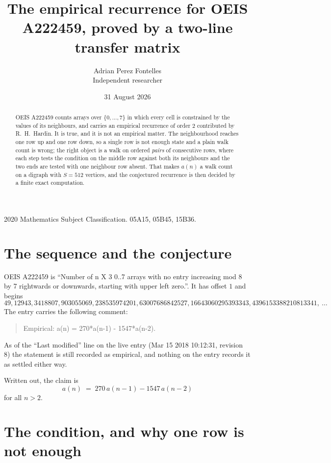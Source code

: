 \documentclass[11pt,a4paper]{article}
\title{The empirical recurrence for OEIS A222459, proved by a two-line transfer matrix}
\author{Adrian Perez Fontelles\\ \small Independent researcher}
\date{31 August 2026}
\theoremstyle{plain}
\theoremstyle{definition}
\begin{document}
\maketitle

\begin{abstract}
OEIS A222459 counts arrays over $\{0,\dots,7\}$ in which every cell is constrained by the
values of its neighbours, and carries an empirical recurrence of order $2$ contributed
by R.~H.~Hardin. It is true, and it is not an empirical matter. The neighbourhood reaches one
row up and one row down, so a single row is not enough state and a plain walk count
is wrong; the right object is a walk on ordered \emph{pairs} of consecutive rows, where
each step tests the condition on the middle row against both its neighbours and the two
ends are tested with one neighbour row absent. That makes $a(n)$ a walk count on a digraph
with $S=512$ vertices, and the conjectured recurrence is then decided by a finite exact
computation.
\end{abstract}

\noindent\small 2020 Mathematics Subject Classification. 05A15, 05B45, 15B36.\normalsize

\section{The sequence and the conjecture}

OEIS A222459 is ``Number of n X 3 0..7 arrays with no entry increasing mod 8 by 7 rightwards or downwards, starting with upper left zero.''. It has offset $1$ and begins
\[
49, 12943, 3418807, 903055069, 238535974201, 63007686842527, 16643060295393343, 4396153388210813341,\ \dots
\]
The entry carries the following comment:
\begin{quote}\small
Empirical: a(n) = 270*a(n-1) - 1547*a(n-2).
\end{quote}
As of the ``Last modified'' line on the live entry (Mar 15 2018 10:12:31, revision 8) the statement is
still recorded as empirical, and nothing on the entry records it as settled either way.

Written out, the claim is
\begin{equation}\label{eq:conj}
a(n)\;=\;270\,a(n-1) - 1547\,a(n-2)
\end{equation}
for all $n>2$.

\section{The condition, and why one row is not enough}
\end{document}
